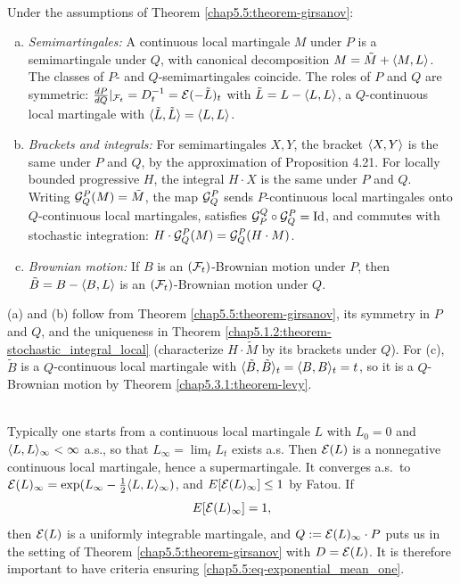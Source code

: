 \begin{corollary}\label{chap5.5:corollary-girsanov_consequences}
\\
Under the assumptions of Theorem \ref{chap5.5:theorem-girsanov}:
\begin{enumerate}[(a)]
    \item \textit{Semimartingales:} A continuous local martingale $M$ under $P$ is a semimartingale under $Q$, with canonical decomposition $M=\tilde M+\langle M,L\rangle$. The classes of $P$- and $Q$-semimartingales coincide. The roles of $P$ and $Q$ are symmetric: $\frac{dP}{dQ}|_{\mathcal{F}_t}=D_t^{-1}=\mathcal{E}(-\tilde L)_t$ with $\tilde L=L-\langle L,L\rangle$, a $Q$-continuous local martingale with $\langle \tilde L,\tilde L\rangle=\langle L,L\rangle$.
    \item \textit{Brackets and integrals:} For semimartingales $X,Y$, the bracket $\langle X,Y\rangle$ is the same under $P$ and $Q$, by the approximation of Proposition 4.21. For locally bounded progressive $H$, the integral $H\cdot X$ is the same under $P$ and $Q$. Writing $\mathcal{G}^P_Q(M)=\tilde M$, the map $\mathcal{G}^P_Q$ sends $P$-continuous local martingales onto $Q$-continuous local martingales, satisfies $\mathcal{G}^Q_P\circ\mathcal{G}^P_Q=\mathrm{Id}$, and commutes with stochastic integration: $H\cdot\mathcal{G}^P_Q(M)=\mathcal{G}^P_Q(H\cdot M)$.
    \item \textit{Brownian motion:} If $B$ is an $(\mathcal{F}_t)$-Brownian motion under $P$, then $\tilde B=B-\langle B,L\rangle$ is an $(\mathcal{F}_t)$-Brownian motion under $Q$.
\end{enumerate}
\end{corollary}

\begin{proofidea}
(a) and (b) follow from Theorem \ref{chap5.5:theorem-girsanov}, its symmetry in $P$ and $Q$, and the uniqueness in Theorem \ref{chap5.1.2:theorem-stochastic_integral_local} (characterize $H\cdot\tilde M$ by its brackets under $Q$). For (c), $\tilde B$ is a $Q$-continuous local martingale with $\langle \tilde B,\tilde B\rangle_t=\langle B,B\rangle_t=t$, so it is a $Q$-Brownian motion by Theorem \ref{chap5.3.1:theorem-levy}.
\end{proofidea}

\begin{remark}\label{chap5.5:remark-constructing_Q}
\\
Typically one starts from a continuous local martingale $L$ with $L_0=0$ and $\langle L,L\rangle_\infty<\infty$ a.s., so that $L_\infty=\lim_tL_t$ exists a.s. Then $\mathcal{E}(L)$ is a nonnegative continuous local martingale, hence a supermartingale. It converges a.s.\ to $\mathcal{E}(L)_\infty=\exp(L_\infty-\frac12\langle L,L\rangle_\infty)$, and $E[\mathcal{E}(L)_\infty]\leq1$ by Fatou. If
\begin{equation}\label{chap5.5:eq-exponential_mean_one}
    E[\mathcal{E}(L)_\infty]=1,
\end{equation}
then $\mathcal{E}(L)$ is a uniformly integrable martingale, and $Q:=\mathcal{E}(L)_\infty\cdot P$ puts us in the setting of Theorem \ref{chap5.5:theorem-girsanov} with $D=\mathcal{E}(L)$. It is therefore important to have criteria ensuring \eqref{chap5.5:eq-exponential_mean_one}.
\end{remark}

